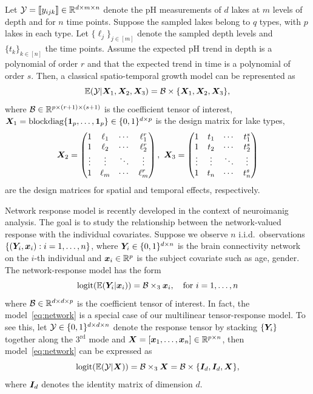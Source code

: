 \documentclass[11pt]{article}
\theoremstyle{plain}
\theoremstyle{definition}
\begin{document}
\begin{example}
Let $\mathcal{Y}=\llbracket y_{ijk} \rrbracket\in\mathbb{R}^{d \times m\times n}$ denote the pH measurements of $d$ lakes at $m$ levels of depth and for $n$ time points. Suppose the sampled lakes belong to $q$ types, with $p$ lakes in each type. Let $\{\ell_j\}_{j\in[m]}$ denote the sampled depth levels and $\{t_k\}_{k\in[n]}$ the time points. Assume the expected pH trend in depth is a polynomial of order $r$ and that the expected trend in time is a polynomial of order $s$. Then, a classical spatio-temporal growth model can be represented as
\[
\mathbb{E}(\mathcal{Y}|\bm X_1,\bm X_2,\bm X_3)=\mathcal{B}\times\{\bm X_1,\bm X_2,\bm X_3\},
\]
where $\mathcal{B}\in\mathbb{R}^{p\times (r+1)\times (s+1)}$ is the coefficient tensor of interest, $\bm X_1=\text{blockdiag}\{\mathbf{1}_p,\ldots,\mathbf{1}_p\}\in \{0,1\}^{d\times p}$ is the design matrix for lake types, 
\[
\bm X_2=
\begin{pmatrix}
1 & \ell_1&\cdots &\ell^{r}_1\\
1 & \ell_2&\cdots &\ell^{r}_2\\
\vdots &\vdots&\ddots&\vdots\\
1&\ell_{m}&\cdots&\ell^{r}_{m}
\end{pmatrix},\
\bm X_3=
\begin{pmatrix}
1 & t_1&\cdots &t^{s}_1\\
1 & t_2&\cdots &t^{s}_2\\
\vdots &\vdots&\ddots&\vdots\\
1&t_{n}&\cdots&t^{s}_{n}
\end{pmatrix}
\]
are the design matrices for spatial and temporal effects, respectively. 
\end{example}
\begin{example} 
Network response model is recently developed in the context of neuroimanig analysis. The goal is to study the relationship between the network-valued response with the individual covariates. Suppose we observe $n$ i.i.d.\ observations $\{(\bm Y_i, \bm x_i): i=1,\ldots,n\}$, where $\bm Y_i\in\{0,1\}^{d\times n}$ is the brain connectivity network on the $i$-th individual and $\bm x_i\in\mathbb{R}^p$ is the subject covariate such as age, gender. The network-response model has the form
\begin{equation}\label{eq:network}
\text{logit}(\mathbb{E}(\bm Y_i|\bm x_i))=\mathcal{B}\times_3\bm x_i, \quad \text{for }i=1,\ldots,n
\end{equation}
where $\mathcal{B}\in \mathbb{R}^{d\times d\times p}$ is the coefficient tensor of interest. In fact, the model~\eqref{eq:network} is a special case of our multilinear tensor-response model. To see this, let $\mathcal{Y}\in\{0,1\}^{d\times d\times n}$ denote the response tensor by stacking $\{\bm Y_i\}$ together along the 3$^\text{rd}$ mode and $\bm X=[\bm x_1,\ldots,\bm x_n]\in\mathbb{R}^{p\times n}$, then model~\eqref{eq:network} can be expressed as 
\[
\text{logit}(\mathbb{E}(\mathcal{Y}|\bm X))=\mathcal{B}\times_3 \bm X=\mathcal{B}\times\{\bm I_d, \bm I_d, \bm X\},
\]
where $\bm I_d$ denotes the identity matrix of dimension $d$. 
 \end{example}
 
\end{document}
